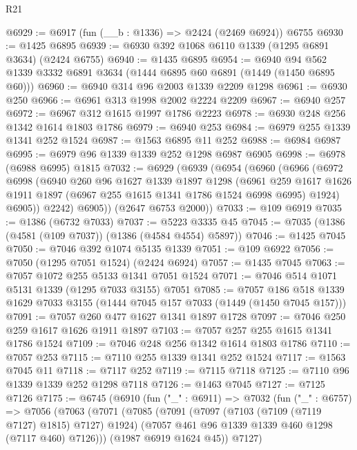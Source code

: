 \begin{lexlean}{R21}
\begin{coremodule}
@6929 := @6917 (fun (__b : @1336) => @2424 (@2469 @6924)) @6755
@6930 := @1425 @6895
@6939 := @6930 @392 @1068 @6110 @1339 (@1295 @6891 @3634) (@2424 @6755)
@6940 := @1435 @6895
@6954 := @6940 @94 @562 @1339 @3332 @6891 @3634 (@1444 @6895 @60 @6891 (@1449 (@1450 @6895 @60)))
@6960 := @6940 @314 @96 @2003 @1339 @2209 @1298
@6961 := @6930 @250
@6966 := @6961 @313 @1998 @2002 @2224 @2209
@6967 := @6940 @257
@6972 := @6967 @312 @1615 @1997 @1786 @2223
@6978 := @6930 @248 @256 @1342 @1614 @1803 @1786
@6979 := @6940 @253
@6984 := @6979 @255 @1339 @1341 @252 @1524
@6987 := @1563 @6895 @11 @252
@6988 := @6984 @6987
@6995 := @6979 @96 @1339 @1339 @252 @1298 @6987 @6905
@6998 := @6978 (@6988 @6995) @1815
@7032 := @6929
    (@6939
      (@6954
        (@6960
          (@6966
            (@6972
              @6998
              (@6940
                @260
                @96
                @1627
                @1339
                @1897
                @1298
                (@6961
                  @259
                  @1617
                  @1626
                  @1911
                  @1897
                  (@6967 @255 @1615 @1341 @1786 @1524 @6998 @6995)
                  @1924)
                @6905))
            @2242)
          @6905))
      (@2647 @6753 @2000))
@7033 := @109 @6919
@7035 := @1386 (@6732 @7033)
@7037 := @5223 @3335 @45
@7045 := @7035 (@1386 (@4581 (@109 @7037)) (@1386 (@4584 @4554) @5897))
@7046 := @1425 @7045
@7050 := @7046 @392 @1074 @5135 @1339
@7051 := @109 @6922
@7056 := @7050 (@1295 @7051 @1524) (@2424 @6924)
@7057 := @1435 @7045
@7063 := @7057 @1072 @255 @5133 @1341 @7051 @1524
@7071 := @7046 @514 @1071 @5131 @1339 (@1295 @7033 @3155) @7051
@7085 := @7057 @186 @518 @1339 @1629 @7033 @3155 (@1444 @7045 @157 @7033 (@1449 (@1450 @7045 @157)))
@7091 := @7057 @260 @477 @1627 @1341 @1897 @1728
@7097 := @7046 @250 @259 @1617 @1626 @1911 @1897
@7103 := @7057 @257 @255 @1615 @1341 @1786 @1524
@7109 := @7046 @248 @256 @1342 @1614 @1803 @1786
@7110 := @7057 @253
@7115 := @7110 @255 @1339 @1341 @252 @1524
@7117 := @1563 @7045 @11
@7118 := @7117 @252
@7119 := @7115 @7118
@7125 := @7110 @96 @1339 @1339 @252 @1298 @7118
@7126 := @1463 @7045
@7127 := @7125 @7126
@7175 := @6745
    (@6910
      (fun ("_" : @6911) =>
      @7032
        (fun ("_" : @6757) =>
        @7056
          (@7063
            (@7071
              (@7085
                (@7091
                  (@7097 (@7103 (@7109 (@7119 @7127) @1815) @7127) @1924)
                  (@7057 @461 @96 @1339 @1339 @460 @1298 (@7117 @460) @7126)))
              (@1987 @6919 @1624 @45))
            @7127)

\end{coremodule}
\end{lexlean}
